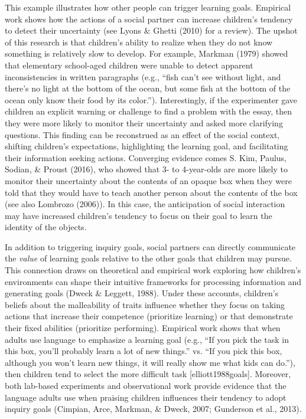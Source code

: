 \documentclass[oneside]{report}
\begin{document}
This example illustrates how other people can trigger learning goals.
Empirical work shows how the actions of a social partner can increase
children's tendency to detect their uncertainty (see Lyons \& Ghetti
(2010) for a review). The upshot of this research is that children's
ability to realize when they do not know something is relatively slow to
develop. For example, Markman (1979) showed that elementary school-aged
children were unable to detect apparent inconsistencies in written
paragraphs (e.g., ``fish can't see without light, and there's no light
at the bottom of the ocean, but some fish at the bottom of the ocean
only know their food by its color.''). Interestingly, if the
experimenter gave children an explicit warning or challenge to find a
problem with the essay, then they were more likely to monitor their
uncertainty and asked more clarifying questions. This finding can be
reconstrued as an effect of the social context, shifting children's
expectations, highlighting the learning goal, and facilitating their
information seeking actions. Converging evidence comes S. Kim, Paulus,
Sodian, \& Proust (2016), who showed that 3- to 4-year-olds are more
likely to monitor their uncertainty about the contents of an opaque box
when they were told that they would have to teach another person about
the contents of the box (see also Lombrozo (2006)). In this case, the
anticipation of social interaction may have increased children's
tendency to focus on their goal to learn the identity of the objects.

In addition to triggering inquiry goals, social partners can directly
communicate the \emph{value} of learning goals relative to the other
goals that children may pursue. This connection draws on theoretical and
empirical work exploring how children's environments can shape their
intuitive frameworks for processing information and generating goals
(Dweck \& Leggett, 1988). Under these accounts, children's beliefs about
the malleability of traits influence whether they focus on taking
actions that increase their competence (prioritize learning) or that
demonstrate their fixed abilities (prioritize performing). Empirical
work shows that when adults use language to emphasize a learning goal
(e.g., ``If you pick the task in this box, you'll probably learn a lot
of new things.'' vs. ``If you pick this box, although you won't learn
new things, it will really show me what kids can do.''), then children
tend to select the more difficult task {[}elliott1988goals{]}. Moreover,
both lab-based experiments and observational work provide evidence that
the language adults use when praising children influences their tendency
to adopt inquiry goals (Cimpian, Arce, Markman, \& Dweck, 2007;
Gunderson et al., 2013).
\end{document}
